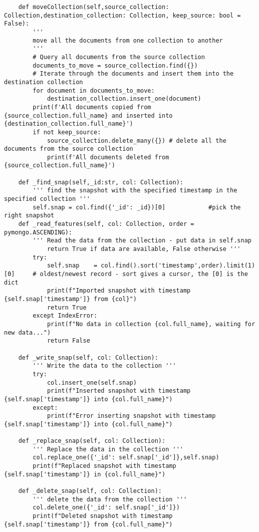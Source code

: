 \begin{verbatim}
    def moveCollection(self,source_collection: Collection,destination_collection: Collection, keep_source: bool = False):
        '''
        move all the documents from one collection to another   
        '''
        # Query all documents from the source collection
        documents_to_move = source_collection.find({})
        # Iterate through the documents and insert them into the destination collection
        for document in documents_to_move:
            destination_collection.insert_one(document)
        print(f'All documents copied from {source_collection.full_name} and inserted into {destination_collection.full_name}')  
        if not keep_source:
            source_collection.delete_many({}) # delete all the documents from the source collection
            print(f'All documents deleted from {source_collection.full_name}') 
    
    def _find_snap(self,_id:str, col: Collection):
        ''' find the snapshot with the specified timestamp in the specified collection '''
        self.snap = col.find({'_id': _id})[0]            #pick the right snapshot
    def _read_features(self, col: Collection, order = pymongo.ASCENDING):
        ''' Read the data from the collection - put data in self.snap
            return True if data are available, False otherwise '''
        try:
            self.snap    = col.find().sort('timestamp',order).limit(1)[0]     # oldest/newest record - sort gives a cursor, the [0] is the dict
            print(f"Imported snapshot with timestamp {self.snap['timestamp']} from {col}")
            return True    
        except IndexError:
            print(f"No data in collection {col.full_name}, waiting for new data...")
            return False
        
    def _write_snap(self, col: Collection):
        ''' Write the data to the collection '''
        try:
            col.insert_one(self.snap)
            print(f"Inserted snapshot with timestamp {self.snap['timestamp']} into {col.full_name}")
        except:
            print(f"Error inserting snapshot with timestamp {self.snap['timestamp']} into {col.full_name}")
        
    def _replace_snap(self, col: Collection):
        ''' Replace the data in the collection '''
        col.replace_one({'_id': self.snap['_id']},self.snap)
        print(f"Replaced snapshot with timestamp {self.snap['timestamp']} in {col.full_name}")
    
    def _delete_snap(self, col: Collection):
        ''' delete the data from the collection '''
        col.delete_one({'_id': self.snap['_id']})
        print(f"Deleted snapshot with timestamp {self.snap['timestamp']} from {col.full_name}")
    
\end{verbatim}